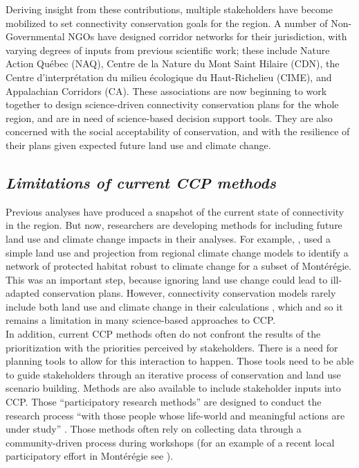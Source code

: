 \documentclass[12pt,Bold,TexShade]{thesis/mcgilletdclass}
\begin{document}
{Deriving insight from these contributions, multiple stakeholders have become mobilized to set connectivity conservation goals for the region. A number of Non-Governmental NGOs have designed corridor networks for their jurisdiction, with varying degrees of inputs from previous scientific work; these include Nature Action Québec (NAQ), Centre de la Nature du Mont Saint Hilaire (CDN), the Centre d'interprétation du milieu écologique du Haut-Richelieu (CIME), and Appalachian Corridors (CA). These associations are now beginning to work together to design science-driven connectivity conservation plans for the whole region, and are in need of science-based decision support tools. They are also concerned with the social acceptability of conservation, and with the resilience of their plans given expected future land use and climate change. \\ \vspace{2em}

\subsection*{\textit{Limitations of current CCP methods \\ \vspace{1em}}}

Previous analyses have produced a snapshot of the current state of connectivity in the region. But now, researchers are developing methods for including future land use and climate change impacts in their analyses. For example, \cite{albert_applying_2017}, used a simple land use and projection from regional climate change models to identify a network of protected habitat robust to climate change for a subset of Montérégie. This was an important step, because ignoring land use change could lead to ill-adapted conservation plans. However, connectivity conservation models rarely include both land use and climate change in their calculations \citep{costanza_landscape_2019}, which and so it remains a limitation in many science-based approaches to  CCP. \\

In addition, current CCP methods often do not confront the results of the prioritization with the priorities perceived by stakeholders. There is a need for planning tools to allow for this interaction to happen. Those tools need to be able to guide stakeholders through an iterative process of conservation and land use scenario building. Methods are also available to include stakeholder inputs into CCP. Those “participatory research methods” are designed to conduct the research process “with those people whose life-world and meaningful actions are under study” \citep{bergold_participatory_2012}. Those methods often rely on collecting data through a community-driven process during workshops (for an example of a recent local participatory effort in Montérégie see \cite{martins_results_2020}). \\

}
\end{document}
